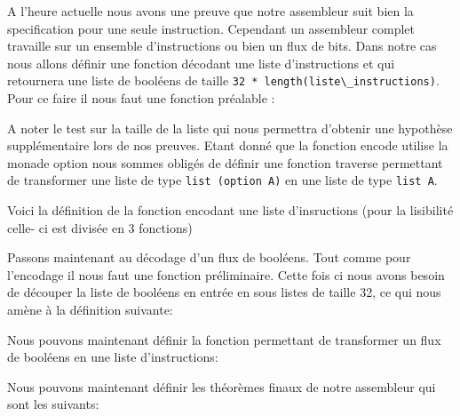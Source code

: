 \documentclass {article}
\newcommand{\codefrom}[3]
           {}
\theoremstyle{definition}
\theoremstyle{remark}
\newcommand{\fun}[1]{\lstinline!#1!}
\begin{document}
A l'heure actuelle nous avons une preuve que notre assembleur suit bien la specification
pour une seule instruction. Cependant un assembleur complet travaille sur un ensemble d'instructions
ou bien un flux de bits. Dans notre cas nous allons définir une fonction décodant une liste d'instructions et qui
retournera une liste de booléens de taille \fun{32 * length(liste\_instructions)}.
Pour ce faire il nous faut une fonction préalable :

\codefrom{src}{encode}{concat_listes_32}

A noter le test sur la taille de la liste
qui nous permettra d'obtenir une hypothèse supplémentaire lors de nos preuves.
Etant donné que la fonction encode utilise la monade option nous sommes obligés de définir une fonction
traverse permettant de transformer une liste de type \fun{list (option A)} en une liste de type \fun{list A}.

\codefrom{src}{encode}{traverse}

Voici la définition de la fonction encodant une liste d'insructions (pour la lisibilité celle- ci est
divisée en 3 fonctions)

\codefrom{src}{encode}{encode_flux}

Passons maintenant au décodage d'un flux de booléens. Tout comme pour l'encodage il nous faut
une fonction préliminaire. Cette fois ci nous avons besoin de découper la liste de booléens
en entrée en sous listes de taille 32, ce qui nous amène à la définition suivante:

\codefrom{src}{encode}{cut_32}

Nous pouvons maintenant définir la fonction permettant de transformer un flux de booléens
en une liste d'instructions:

\codefrom{src}{encode}{decode_flux}



Nous pouvons maintenant définir les théorèmes finaux de notre assembleur qui sont les suivants:

\codefrom{src}{encode}{encode_decode_flux_decoup}

\codefrom{src}{encode}{decode_flux_decoup_encode}

\end{document}
